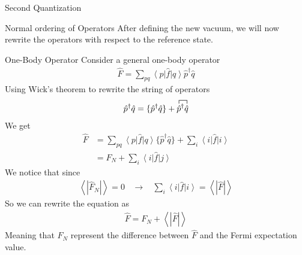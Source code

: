 \documentclass[twoside,english]{uiofysmaster}
\begin{document}
\begin{chapter}{Second Quantization}
	\begin{section}{Normal ordering of Operators}
		After defining the new vacuum, we will now rewrite the operators with respect to the reference state.	
		\begin{subsection}{One-Body Operator}
			 Consider a general one-body operator
			\begin{align}
				\hat F = \sum_{pq} \left< p \right| \hat f \left| q \right> \hat p^\dagger \hat q
			\end{align}
			Using Wick's theorem to rewrite the string of operators
			\begin{align}
				\hat p^\dagger \hat q = \{\hat p^\dagger \hat q \} + \contraction{}{\hat p}{^\dagger}{\hat q}
				\hat p^\dagger \hat q
			\end{align}
			We get 	
			\begin{align}
				\hat F &= \sum_{pq} \left< p \right| \hat f \left| q \right> \{ \hat p^\dagger \hat q \} + \sum_i \left< i \right| \hat f \left| i \right>\\
					&= \hat F_N + \sum_i \left< i \right| \hat f \left| j \right>
			\end{align}
			We notice that since 
			\begin{align}
				\left< \right. | \hat F_N |\left. \right> = 0 \:\:\:\: \rightarrow \:\:\:\: \sum_i \left< i \right| \hat f \left| i \right> = \left< \right. | \hat F | \left. \right>
			\end{align}
			So we can rewrite the equation as
			\begin{align}
				\hat F = F_N + \left< \right. | \hat F | \left. \right>
			\end{align}
			Meaning that $F_N$ represent the difference between $\hat F$ and the Fermi expectation value. 
		\end{subsection}
		

\end{section}
\end{chapter}
\end{document}
